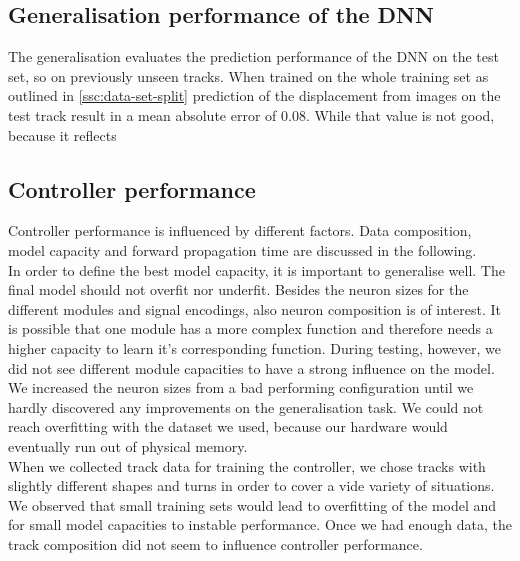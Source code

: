 \documentclass[10pt,a4paper,twoside,journal]{IEEEtran}
\begin{document}
\subsection{Generalisation performance of the DNN}
\label{ssc:generalisation}
The generalisation evaluates the prediction performance of the DNN on the test set, so on previously unseen tracks. When trained on the whole training set as outlined in \autoref{ssc:data-set-split} prediction of the displacement from images on the test track result in a mean absolute error of 0.08. While that value is not good, because it reflects 


\subsection{Controller performance}
Controller performance is influenced by different factors. Data composition, model capacity and forward propagation time are discussed in the following. \\
In order to define the best model capacity, it is important to generalise well. The final model should not overfit nor underfit. Besides the neuron sizes for the different modules and signal encodings, also neuron composition is of interest. It is possible that one module has a more complex function and therefore needs a higher capacity to learn it's corresponding function. During testing, however, we did not see different module capacities to have a strong influence on the model. We increased the neuron sizes from a bad performing configuration until we hardly discovered any improvements on the generalisation task. We could not reach overfitting with the dataset we used, because our hardware would eventually run out of physical memory.\\
When we collected track data for training the controller, we chose tracks with slightly different shapes and turns in order to cover a vide variety of situations. We observed that small training sets would lead to overfitting of the model and for small model capacities to instable performance. Once we had enough data, the track composition did not seem to influence controller performance. \\
\end{document}
